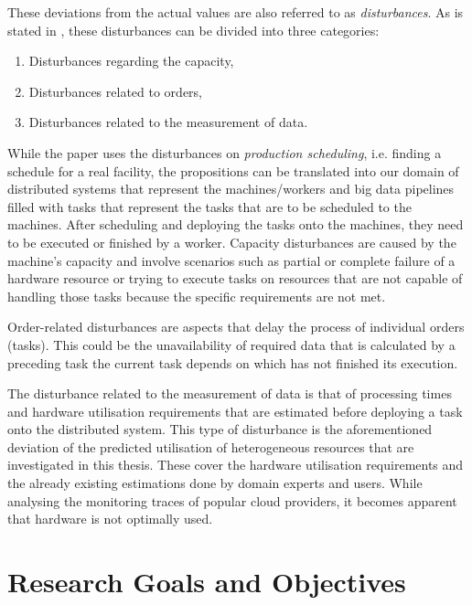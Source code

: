             These deviations from the actual values are also referred to as \emph{disturbances}.
            As is stated in \cite{stoopComplexitySchedulingPractice1996}, these disturbances can be divided into three categories:
            \begin{enumerate}
                \item Disturbances regarding the capacity,
                \item Disturbances related to orders,
                \item Disturbances related to the measurement of data.
            \end{enumerate}
            While the paper uses the disturbances on \emph{production scheduling}, i.e. finding a schedule for a real facility, the propositions can be translated into our domain of distributed systems that represent the machines/workers and big data pipelines filled with tasks that represent the tasks that are to be scheduled to the machines. After scheduling and deploying the tasks onto the machines, they need to be executed or finished by a worker.
            Capacity disturbances are caused by the machine's capacity and involve scenarios such as partial or complete failure of a hardware resource or trying to execute tasks on resources that are not capable of handling those tasks because the specific requirements are not met.
        
            Order-related disturbances are aspects that delay the process of individual orders (tasks).
            This could be the unavailability of required data that is calculated by a preceding task the current task depends on which has not finished its execution.

            The disturbance related to the measurement of data is that of processing times and hardware utilisation requirements that are estimated before deploying a task onto the distributed system. 
            This type of disturbance is the aforementioned deviation of the predicted utilisation of heterogeneous resources that are investigated in this thesis. These cover the hardware utilisation requirements and the already existing estimations done by domain experts and users. While analysing the monitoring traces of popular cloud providers, it becomes apparent that hardware is not optimally used.


        
        \section{Research Goals and Objectives}
        \label{sec:research-objectives-introduction}

